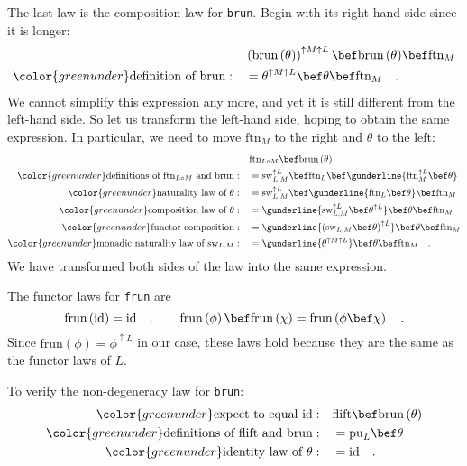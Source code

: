 The last law is the composition law for \lstinline!brun!. Begin with
its right-hand side since it is longer:
\begin{align*}
 & \left(\text{brun}\,(\theta)\right)^{\uparrow M\uparrow L}\bef\text{brun}\,(\theta)\bef\text{ftn}_{M}\\
{\color{greenunder}\text{definition of }\text{brun}:}\quad & =\theta^{\uparrow M\uparrow L}\bef\theta\bef\text{ftn}_{M}\quad.
\end{align*}
We cannot simplify this expression any more, and yet it is still different
from the left-hand side. So let us transform the left-hand side, hoping
to obtain the same expression. In particular, we need to move $\text{ftn}_{M}$
to the right and $\theta$ to the left: 
\begin{align*}
 & \text{ftn}_{L\circ M}\bef\text{brun}\,(\theta)\\
{\color{greenunder}\text{definitions of }\text{ftn}_{L\circ M}\text{ and }\text{brun}:}\quad & =\text{sw}_{L,M}^{\uparrow L}\bef\text{ftn}_{L}\bef\gunderline{\text{ftn}_{M}^{\uparrow L}\bef\theta}\\
{\color{greenunder}\text{naturality law of }\theta:}\quad & =\text{sw}_{L,M}^{\uparrow L}\bef\gunderline{\text{ftn}_{L}\bef\theta}\bef\text{ftn}_{M}\\
{\color{greenunder}\text{composition law of }\theta:}\quad & =\gunderline{\text{sw}_{L,M}^{\uparrow L}\bef\theta^{\uparrow L}}\bef\theta\bef\text{ftn}_{M}\\
{\color{greenunder}\text{functor composition}:}\quad & =\gunderline{\left(\text{sw}_{L,M}\bef\theta\right)^{\uparrow L}}\bef\theta\bef\text{ftn}_{M}\\
{\color{greenunder}\text{monadic naturality law of }\text{sw}_{L,M}:}\quad & =\gunderline{\theta^{\uparrow M\uparrow L}}\bef\theta\bef\text{ftn}_{M}\quad.
\end{align*}
We have transformed both sides of the law into the same expression.

The functor laws for \lstinline!frun! are
\[
\text{frun}\left(\text{id}\right)=\text{id}\quad,\quad\quad\text{frun}\left(\phi\right)\bef\text{frun}\left(\chi\right)=\text{frun}\left(\phi\bef\chi\right)\quad.
\]
Since $\text{frun}\left(\phi\right)=\phi^{\uparrow L}$ in our case,
these laws hold because they are the same as the functor laws of $L$.

To verify the non-degeneracy law for \lstinline!brun!:
\begin{align*}
{\color{greenunder}\text{expect to equal }\text{id}:}\quad & \text{flift}\bef\text{brun}\left(\theta\right)\\
{\color{greenunder}\text{definitions of }\text{flift}\text{ and }\text{brun}:}\quad & =\text{pu}_{L}\bef\theta\\
{\color{greenunder}\text{identity law of }\theta:}\quad & =\text{id}\quad.
\end{align*}

